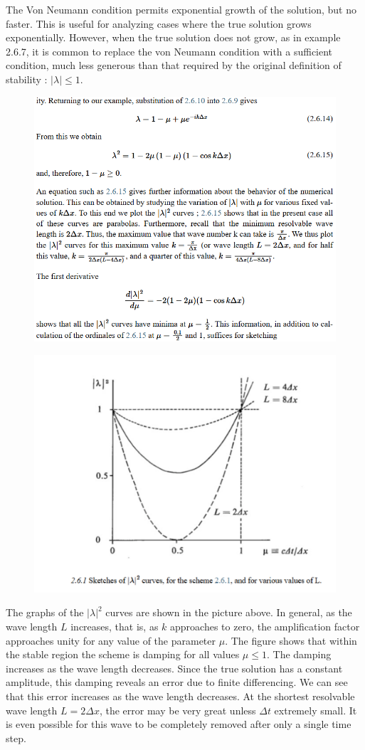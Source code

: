 The Von Neumann condition permits exponential growth of the solution, but no faster. This is useful for analyzing cases where the true solution grows exponentially. However, when the true solution does not grow, as in example 2.6.7, it is common to replace the von Neumann condition with a sufficient condition, much less generous than that required by the original definition of stability : \(|\lambda|\leq1\).
\begin{figure}[htp!]
	\centering
	\includegraphics[width=0.65\linewidth]{uploads/mi.png}
\end{figure}
\begin{figure}[htpb]
	\centering
	\includegraphics[width=0.45\linewidth]{uploads/pp.png}
\end{figure}

The graphs of the $|\lambda|^2$ curves are shown in the picture above. In general, as the wave length $L$ increases, that is, as $k$ approaches to zero, the amplification factor approaches unity for any value of the parameter $\mu$. The figure shows that within the stable region the scheme is damping for all values $\mu\leq 1$. The damping increases as the wave length decreases. Since the true solution has a constant amplitude, this damping reveals an error due to finite differencing. We can see that this error increases as the wave length decreases. At the shortest resolvable wave length $L=2\Delta x$, the error may be very great unless $\Delta t$ extremely small. It is even possible for this wave to be completely removed after only a single time step.


